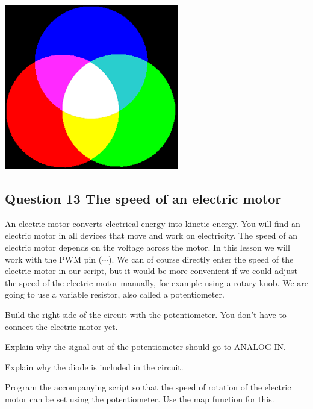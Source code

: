 \documentclass{arduino}
\begin{document}
\begin{center}
\includegraphics[width=0.5\linewidth]{26. Mixing colours}
\end{center}

\newpage

\subsection{Question 13 The speed of an electric motor}



An electric motor converts electrical energy into kinetic energy. You will find an electric motor in all devices that move and work on electricity. The speed of an electric motor depends on the voltage across the motor. In this lesson we will work with the PWM pin ($\sim$). We can of course directly enter the speed of the electric motor in our script, but it would be more convenient if we could adjust the speed of the electric motor manually, for example using a rotary knob. We are going to use a variable resistor, also called a potentiometer.

\begin{alphalist}
\item Build the right side of the circuit with the potentiometer. You don't have to connect the electric motor yet.

\item Explain why the signal out of the potentiometer should go to ANALOG IN.

\item Explain why the diode is included in the circuit.

\item Program the accompanying script so that the speed of rotation of the electric motor can be set using the potentiometer. Use the map function for this.
\end{alphalist}
\end{document}
